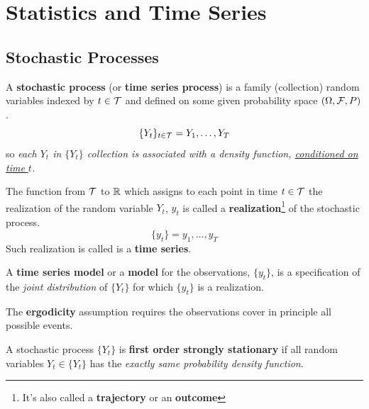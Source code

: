 \documentclass[11pt]{article}
\begin{document}
	\section{Statistics and Time Series}
		\subsection{Stochastic Processes}
		\begin{definition}
			A \textbf{stochastic process} (or \textbf{time series process}) is a family (collection) random variables indexed by $t \in \mathcal{{T}}$ and defined on some given probability space $(\Omega, \mathcal{{F}}, P)$.
			\begin{equation}
				\{Y_t\}_{t \in \mathcal{{T}}} = Y_1, \dots, Y_T
			\end{equation}
			so \emph{each $Y_t$ in $\{Y_t\}$ collection is associated with a density function, \ul{conditioned on time $t$}.}
		\end{definition}
		
		\begin{definition}
			The function from $\mathcal{{T}}$ to $\mathbb{R}$ which assigns to each point in time $t \in \mathcal{{T}}$ the realization of the random variable $Y_t$, $y_t$ is called a \textbf{realization}\footnote{It's also called a \textbf{trajectory} or an \textbf{outcome}} of the stochastic process.
			\begin{equation}
				\{y_t\} = y_1, \dots, y_T
			\end{equation}
			Such realization is called is a \textbf{time series}.
		\end{definition}
		
		\begin{definition}
			A \textbf{time series model} or a \textbf{model} for the observations, $\{y_t\}$, is a specification of the \emph{joint distribution} of $\{Y_t\}$ for which $\{y_t\}$ is a realization.
		\end{definition}
		
		\begin{assumption}
			The \textbf{ergodicity} assumption requires the observations cover in principle all possible events.
		\end{assumption}
		
		\begin{definition}
			A stochastic process $\{Y_t\}$ is \textbf{first order strongly stationary} if all random variables $Y_t \in \{Y_t\}$ has the \emph{exactly same probability density function}.
		\end{definition}
		
\end{document}
